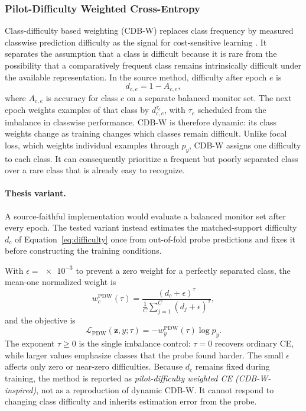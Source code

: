 \documentclass[11pt]{article}
\begin{document}
\subsubsection{Pilot-Difficulty Weighted Cross-Entropy}
\label{sec:pdw-ce}
Class-difficulty based weighting (CDB-W) replaces class frequency by measured classwise prediction difficulty as the signal for cost-sensitive learning \citep{sinha2022classDifficulty}. It separates the assumption that a class is difficult because it is rare from the possibility that a comparatively frequent class remains intrinsically difficult under the available representation. In the source method, difficulty after epoch $e$ is
\begin{equation}
  d_{c,e}=1-A_{c,e},
  \label{eq:cdb-difficulty}
\end{equation}
\noindent where $A_{c,e}$ is accuracy for class $c$ on a separate balanced monitor set. The next epoch weights examples of that class by $d_{c,e}^{\tau_e}$, with $\tau_e$ scheduled from the imbalance in classwise performance. CDB-W is therefore dynamic: its class weights change as training changes which classes remain difficult. Unlike focal loss, which weights individual examples through $p_y$, CDB-W assigns one difficulty to each class. It can consequently prioritize a frequent but poorly separated class over a rare class that is already easy to recognize.

\paragraph{Thesis variant.}
A source-faithful implementation would evaluate a balanced monitor set after every epoch. The tested variant instead estimates the matched-support difficulty $d_c$ of Equation~\eqref{eq:difficulty} once from out-of-fold probe predictions and fixes it before constructing the training conditions.

With $\epsilon=\num{e-3}$ to prevent a zero weight for a perfectly separated class, the mean-one normalized weight is
\begin{equation}
  w_c^{\mathrm{PDW}}(\tau)=
  \frac{(d_c+\epsilon)^{\tau}}
       {\frac{1}{C}\sum_{j=1}^{C}(d_j+\epsilon)^{\tau}},
  \label{eq:pdw-weight}
\end{equation}
\noindent and the objective is
\begin{equation}
  \mathcal{L}_{\mathrm{PDW}}(\mathbf z,y;\tau)=-w_y^{\mathrm{PDW}}(\tau)\log p_y.
  \label{eq:pdw-ce}
\end{equation}
\noindent The exponent $\tau\geq0$ is the single imbalance control: $\tau=0$ recovers ordinary CE, while larger values emphasize classes that the probe found harder. The small $\epsilon$ affects only zero or near-zero difficulties. Because $d_c$ remains fixed during training, the method is reported as \emph{pilot-difficulty weighted CE (CDB-W-inspired)}, not as a reproduction of dynamic CDB-W. It cannot respond to changing class difficulty and inherits estimation error from the probe.
\end{document}
